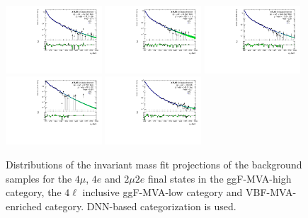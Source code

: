 \begin{figure}[htbp]
    \centering
    \includegraphics[width=0.32\textwidth]{figures/HMHZZ/background/dnn/bkg_shape_ggZZ_ggF_4mu_180_to_2200_log.pdf}
    \includegraphics[width=0.32\textwidth]{figures/HMHZZ/background/dnn/bkg_shape_ggZZ_ggF_4e_185_to_2200_log.pdf}
    \includegraphics[width=0.32\textwidth]{figures/HMHZZ/background/dnn/bkg_shape_ggZZ_ggF_2mu2e_185_to_2200_log.pdf} \\
    \includegraphics[width=0.32\textwidth]{figures/HMHZZ/background/dnn/bkg_shape_ggZZ_VBF_incl_180_to_2200_log.pdf}
    \includegraphics[width=0.32\textwidth]{figures/HMHZZ/background/dnn/bkg_shape_ggZZ_rest_190_to_2200_log.pdf}
    \caption{Distributions of the \mfl invariant mass fit projections of the \ggZZ background samples for the $4\mu$,
    $4e$ and $2\mu 2e$ final states in the ggF-MVA-high category, the $4\ell$ inclusive ggF-MVA-low category and VBF-MVA-enriched category.
    DNN-based categorization is used.} 
    \label{fig:ggZZ_m4l_shape_all_DNN}
\end{figure}

